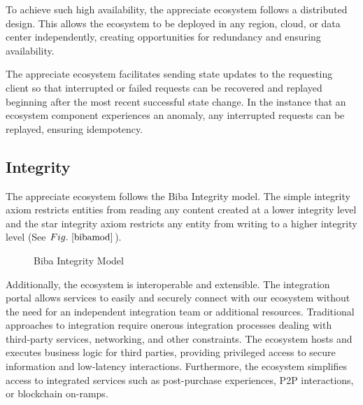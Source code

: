 \documentclass[a4paper,onecolumn, 10.5pt]{article}
\begin{document}
To achieve such high availability, the appreciate ecosystem follows a distributed design. This allows the ecosystem to be deployed in any region, cloud, or data center independently, creating opportunities for redundancy and ensuring availability.

The appreciate ecosystem facilitates sending state updates to the requesting client so that interrupted or failed requests can be recovered and replayed beginning after the most recent successful state change. In the instance that an ecosystem component experiences an anomaly, any interrupted requests can be replayed, ensuring idempotency.

\subsection{Integrity}

The appreciate ecosystem follows the Biba Integrity\cite{biba} model. The simple integrity axiom restricts entities from reading any content created at a lower integrity level and the star integrity axiom restricts any entity from writing to a higher integrity level (See \(Fig.~\ref{bibamod}\)).

\begin{figure}[!htb]
	\centering %
	\caption{Biba Integrity Model}
	\label{bibamod}
\end{figure}



Additionally, the ecosystem is interoperable and extensible. The integration portal allows services to easily and securely connect with our ecosystem without the need for an independent integration team or additional resources. Traditional approaches to integration require onerous integration processes dealing with third-party services, networking, and other constraints. The ecosystem hosts and executes business logic for third parties, providing privileged access to secure information and low-latency interactions. Furthermore, the ecosystem simplifies access to integrated services such as post-purchase experiences, P2P interactions, or blockchain on-ramps. 
\end{document}
